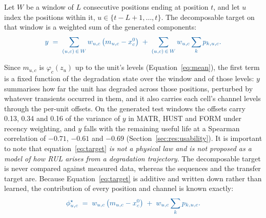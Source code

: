 \documentclass{article}
\newif\ifreview \reviewtrue        %
\newcommand{\rev}[1]{\ifreview\textcolor[HTML]{0B5FA5}{#1}\else#1\fi}
\newcommand{\revwhy}[1]{\ifreview\marginpar{\footnotesize\raggedright\textcolor[HTML]{0B5FA5}{#1}}\fi}
\begin{document}
Let $W$ be a window of $L$ consecutive positions ending at position $t$, and let $u$ index the positions within it, $u \in \{t-L+1,\dots,t\}$. The decomposable target on that window is a weighted sum of the generated components:\revwhy{C1: one weight per cell, about $x^{0}$}
\begin{equation}
  \rev{y \;=\; \sum_{(u,c)\,\in\, W} w_{u,c} \left( m_{u,c} - x^{0}_{c} \right) \;+\; \sum_{(u,c)\,\in\, W} w_{u,c} \sum_k p_{k,u,c}.}
  \label{eq:target}
\end{equation}

Since \rev{$m_{u,c}$ is $\varphi_c(z_u)$ up to the unit's levels (Equation~\ref{eq:mean})}, the first term is a fixed function of the degradation state over the window \rev{and of those levels}: $y$ summarises how far the unit has degraded across those positions, perturbed by whatever transients occurred in them\rev{, and it also carries each cell's channel levels through the per-unit offsets}.\revwhy{X2: unit levels enter $y$} \rev{On the generated test windows the offsets carry 0.13, 0.34 and 0.16 of the variance of $y$ in MATR, HUST and FORM under recency weighting, and $y$ falls with the remaining useful life at a Spearman correlation of $-0.71$, $-0.61$ and $-0.69$ (Section~\ref{sec:res:usability}).}\revwhy{X2, v2.1: offset share and Spearman$(y, R)$ per profile} It is important to note that equation~\ref{eq:target} \emph{is not a physical law and is not proposed as a model of how RUL arises from a degradation trajectory}. The decomposable target is never compared against measured data, whereas the sequences and the transfer target are.
Because Equation~\ref{eq:target} is additive and written down rather than learned, the contribution of every position and channel is known exactly:
\begin{equation}
  \rev{\phi^{\star}_{u,c} \;=\; w_{u,c} \left( m_{u,c} - x^{0}_{c} \right) \;+\; w_{u,c} \sum_k p_{k,u,c}.}
  \label{eq:groundtruth}
\end{equation}
\end{document}
